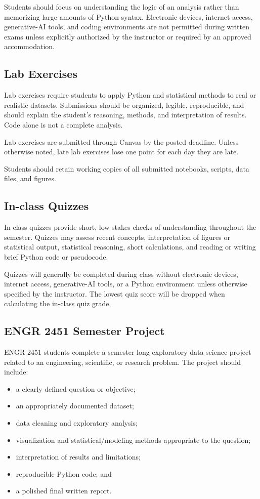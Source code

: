 \documentclass[11pt]{article}
\begin{document}
Students should focus on understanding the logic of an analysis rather than memorizing large amounts of Python syntax. Electronic devices, internet access, generative-AI tools, and coding environments are not permitted during written exams unless explicitly authorized by the instructor or required by an approved accommodation.

\subsection{Lab Exercises}

Lab exercises require students to apply Python and statistical methods to real or realistic datasets. Submissions should be organized, legible, reproducible, and should explain the student's reasoning, methods, and interpretation of results. Code alone is not a complete analysis.

Lab exercises are submitted through Canvas by the posted deadline. Unless otherwise noted, late lab exercises lose one point for each day they are late.

Students should retain working copies of all submitted notebooks, scripts, data files, and figures.

\subsection{In-class Quizzes}

In-class quizzes provide short, low-stakes checks of understanding throughout the semester. Quizzes may assess recent concepts, interpretation of figures or statistical output, statistical reasoning, short calculations, and reading or writing brief Python code or pseudocode.

Quizzes will generally be completed during class without electronic devices, internet access, generative-AI tools, or a Python environment unless otherwise specified by the instructor. The lowest quiz score will be dropped when calculating the in-class quiz grade.

\subsection{ENGR 2451 Semester Project}

ENGR 2451 students complete a semester-long exploratory data-science project related to an engineering, scientific, or research problem. The project should include:

\begin{itemize}
  \item a clearly defined question or objective;
  \item an appropriately documented dataset;
  \item data cleaning and exploratory analysis;
  \item visualization and statistical/modeling methods appropriate to the question;
  \item interpretation of results and limitations;
  \item reproducible Python code; and
  \item a polished final written report.
\end{itemize}
\end{document}
